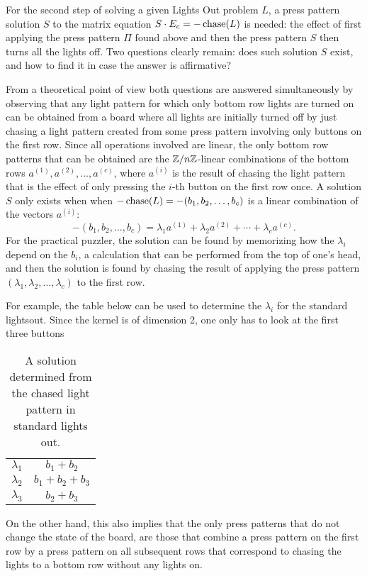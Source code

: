 For the second step of solving a given Lights Out problem
$L$, a press pattern solution $S$ to the matrix
equation $S\cdot E_c=-\operatorname{chase}(L)$ is needed:
the effect of first applying the press pattern
$\Pi$ found above and then the press pattern $S$ then turns all the lights off.
Two questions clearly remain: does such solution $S$ exist, and how
to find it in case the answer is affirmative?

From a theoretical point of view
both questions are answered simultaneously by observing that
any light pattern for which only bottom row lights are turned on
can be obtained from a board where all lights are initially turned off
by just chasing a light pattern created from some
press pattern involving only buttons on the first row.
Since all operations involved are linear, the only bottom row patterns
that can be obtained are the $\mathbb{Z}/n\mathbb{Z}$-linear combinations of the
bottom rows $a^{(1)}, a^{(2)}, \ldots, a^{(c)}$, where $a^{(i)}$ is the result of
chasing the light pattern that is the effect of only pressing the $i$-th
button on the first row once. A solution $S$ only exists when
when $-\operatorname{chase}(L)=-(b_1, b_2, \ldots, b_c)$ is a linear combination
of the vectors $a^{(i)}$:
$$-(b_1, b_2, \ldots, b_c)=\lambda_1a^{(1)}+\lambda_2a^{(2)}+\cdots+\lambda_ca^{(c)}.$$
For the practical puzzler, the solution can be found by memorizing how the $\lambda_{i}$ depend on the $b_{i}$,
a calculation that can be performed from the top of one's head, and then the solution is found
by chasing the result of applying the press pattern 
$(\lambda_1, \lambda_2, \ldots, \lambda_c)$ to the first row.

For example, the table below can be used to determine the $\lambda_{i}$ for the standard lightsout. Since the kernel is of dimension 2, one only has to look at the first three buttons

\begin{table}
  \begin{center}
    \begin{tabular}{|c|c|}
      \hline
      \hline
$\lambda_1$ & $b_1 + b_2$\\
$\lambda_2$ & $b_1 + b_2 + b_3$\\
$\lambda_3$ & $b_2 + b_3$\\
        \hline
    \end{tabular}
  \end{center}
  \caption{A solution determined from the chased light pattern in standard lights out.}
  \label{tab:solution}
\end{table}

On the other hand, this also implies that the only press patterns
that do not change the state of the board, are those that combine
a press pattern on the first row by a press pattern on all subsequent
rows that correspond to chasing the lights to a bottom row without any
lights on.

